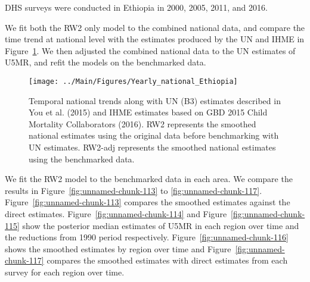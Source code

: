 \documentclass[12pt]{article}\usepackage[]{graphicx}\usepackage[]{color}
\newenvironment{knitrout}{}{} %
\begin{document}


DHS surveys were conducted in Ethiopia in 2000, 2005, 2011, and 2016.

We fit both the RW2 only model to the combined national data, and compare the time trend at national level with the estimates produced by the UN and IHME in Figure~\ref{fig:unnamed-chunk-112}. We then adjusted the combined national data to the UN estimates of U5MR, and refit the models on the benchmarked data. 

\begin{knitrout}
\color{fgcolor}\begin{figure}[bht]

{\centering \texttt{[image: ../Main/Figures/Yearly\_national\_Ethiopia]} 

}

\caption[Temporal national trends along with UN (B3) estimates described in You et al]{Temporal national trends along with UN (B3) estimates described in You et al. (2015) and IHME estimates based on GBD 2015 Child Mortality Collaborators (2016). RW2 represents the smoothed national estimates using the original data before benchmarking with UN estimates. RW2-adj represents the smoothed national estimates using the benchmarked data.}\label{fig:unnamed-chunk-112}
\end{figure}


\end{knitrout}
 

We fit the RW2 model to the benchmarked data in each area. 
We compare the results in Figure~\ref{fig:unnamed-chunk-113} to \ref{fig:unnamed-chunk-117}.
Figure~\ref{fig:unnamed-chunk-113} compares the smoothed estimates against the direct estimates. Figure~\ref{fig:unnamed-chunk-114} and Figure~\ref{fig:unnamed-chunk-115} show the posterior median estimates of U5MR in each region over time and the reductions from 1990 period respectively.
Figure~\ref{fig:unnamed-chunk-116} shows the smoothed estimates by region over time and Figure~\ref{fig:unnamed-chunk-117} compares the smoothed estimates with direct estimates from each survey for each region over time.


\end{document}

